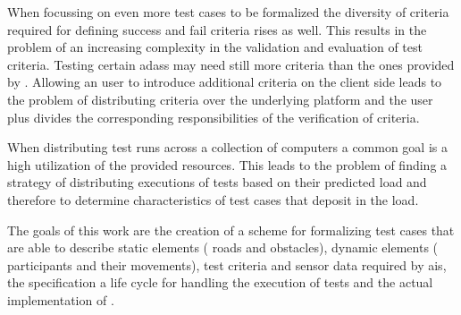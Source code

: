 When focussing on even more test cases to be formalized the diversity of criteria required for defining success and fail criteria rises as well.
This results in the problem of an increasing complexity in the validation and evaluation of test criteria.
Testing certain \glspl{adas} may need still more criteria than the ones provided by \drivebuild{}.
Allowing an user to introduce additional criteria on the client side leads to the problem of distributing criteria over the underlying platform and the user plus divides the corresponding responsibilities of the verification of criteria.\par

When distributing test runs across a collection of computers a common goal is a high utilization of the provided resources.
This leads to the problem of finding a strategy of distributing executions of tests based on their predicted load and therefore to determine characteristics of test cases that deposit in the load.\par

The goals of this work are the creation of a scheme for formalizing test cases that are able to describe static elements (\eg{} roads and obstacles), dynamic elements (\eg{} participants and their movements), test criteria and sensor data required by \glspl{ai}, the specification a life cycle for handling the execution of tests and the actual implementation of \drivebuild{}.

